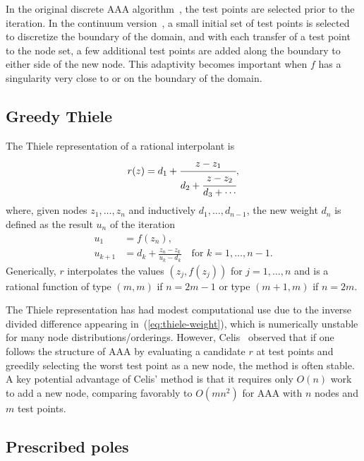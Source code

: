 \documentclass{juliacon}
\begin{document}
In the original discrete AAA algorithm~\cite{nakatsukasaAAAAlgorithm2018}, the test points are selected prior to the iteration. In the continuum version~\cite{driscollAAARational2024}, a small initial set of test points is selected to discretize the boundary of the domain, and with each transfer of a test point to the node set, a few additional test points are added along the boundary to either side of the new node. This adaptivity becomes important when $f$ has a singularity very close to or on the boundary of the domain.

\subsection{Greedy Thiele}
\label{sec:thiele}

The Thiele representation of a rational interpolant is~\cite{celisAdaptiveThiele2023,milne-thompsonCalculusFinite1933}
\begin{equation}
    \label{eq:thiele}
    r(z) = d_1 + \cfrac{z - z_1}{d_2 + \cfrac{z - z_2}{d_3 + \cdots}},
\end{equation}
where, given nodes $z_1,\ldots , z_n$ and inductively $d_1,\ldots,d_{n-1}$, the new weight $d_n$ is defined as the result $u_n$ of the iteration
\begin{equation}
    \label{eq:thiele-weight}
    \begin{split}
        u_1 &= f(z_n), \\
        u_{k+1} &= d_k + \frac{z_n - z_k}{u_k - d_k} \quad \text{for } k=1,\ldots,n-1.
    \end{split}
\end{equation}
Generically, $r$ interpolates the values $(z_j,f(z_j))$ for $j=1,\ldots, n$ and is a rational function of type $(m,m)$ if $n=2m-1$ or type $(m+1,m)$ if $n=2m$. 

The Thiele representation has had modest computational use due to the inverse divided difference appearing in~(\ref{eq:thiele-weight}), which is numerically unstable for many node distributions/orderings. However, Celis~\cite{celisAdaptiveThiele2023,celisNumericalContinued2024} observed that if one follows the structure of AAA by evaluating a candidate $r$ at test points and greedily selecting the worst test point as a new node, the method is often stable. A key potential advantage of Celis' method is that it requires only $O(n)$ work to add a new node, comparing favorably to $O(mn^2)$ for AAA with $n$ nodes and $m$ test points.

\subsection{Prescribed poles}
\label{sec:parfrac}
\end{document}
